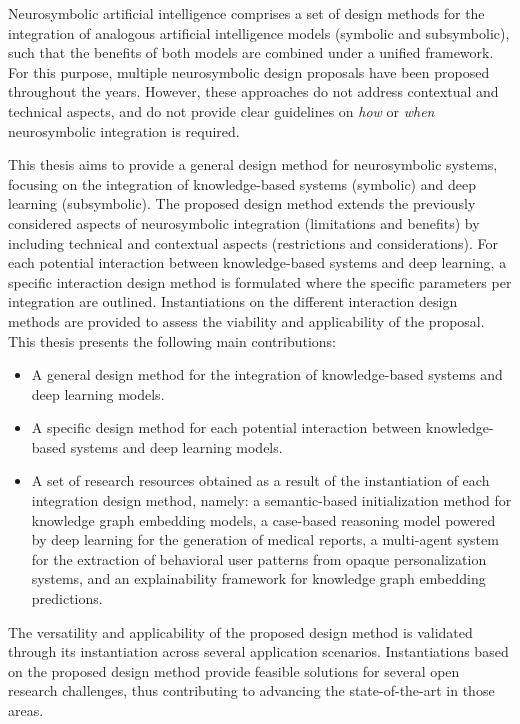 


\begin{abstractslong}    
Neurosymbolic artificial intelligence comprises a set of design methods for the integration of analogous artificial intelligence models (symbolic and subsymbolic), such that the benefits of both models are combined under a unified framework. For this purpose, multiple neurosymbolic design proposals have been proposed throughout the years. However, these approaches do not address contextual and technical aspects, and do not provide clear guidelines on \textit{how} or \textit{when} neurosymbolic integration is required.

This thesis aims to provide a general design method for neurosymbolic systems, focusing on the integration of knowledge-based systems (symbolic) and deep learning (subsymbolic). The proposed design method extends the previously considered aspects of neurosymbolic integration (limitations and benefits) by including technical and contextual aspects (restrictions and considerations). For each potential interaction between knowledge-based systems and deep learning, a specific interaction design method is formulated where the specific parameters per integration are outlined. Instantiations on the different interaction design methods are provided to assess the viability and applicability of the proposal. This thesis presents the following main contributions:
\begin{itemize}
    \item A general design method for the integration of knowledge-based systems and deep learning models.
    \item A specific design method for each potential interaction between knowledge-based systems and deep learning models. 
    \item A set of research resources obtained as a result of the instantiation of each integration design method, namely: a semantic-based initialization method for knowledge graph embedding models, a case-based reasoning model powered by deep learning for the generation of medical reports, a multi-agent system for the extraction of behavioral user patterns from opaque personalization systems, and an explainability framework for knowledge graph embedding predictions.
\end{itemize}
The versatility and applicability of the proposed design method is validated through its instantiation across several application scenarios. Instantiations based on the proposed design method provide feasible solutions for several open research challenges, thus contributing to advancing the state-of-the-art in those areas.
\end{abstractslong}

\cleardoublepage
\begin{abstractslongSpanish}




\end{abstractslongSpanish}
